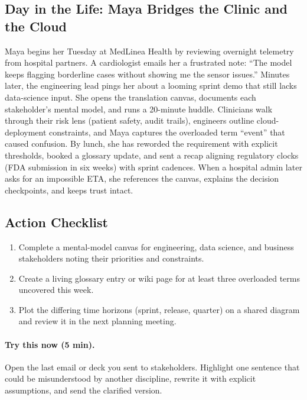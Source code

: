 \subsection{Day in the Life: Maya Bridges the Clinic and the Cloud}
Maya begins her Tuesday at MedLinea Health by reviewing overnight telemetry from hospital partners. A cardiologist emails her a frustrated note: ``The model keeps flagging borderline cases without showing me the sensor issues.'' Minutes later, the engineering lead pings her about a looming sprint demo that still lacks data-science input. She opens the translation canvas, documents each stakeholder's mental model, and runs a 20-minute huddle. Clinicians walk through their risk lens (patient safety, audit trails), engineers outline cloud-deployment constraints, and Maya captures the overloaded term ``event'' that caused confusion. By lunch, she has reworded the requirement with explicit thresholds, booked a glossary update, and sent a recap aligning regulatory clocks (FDA submission in six weeks) with sprint cadences. When a hospital admin later asks for an impossible ETA, she references the canvas, explains the decision checkpoints, and keeps trust intact.

\subsection{Action Checklist}
\begin{enumerate}
    \item Complete a mental-model canvas for engineering, data science, and business stakeholders noting their priorities and constraints.
    \item Create a living glossary entry or wiki page for at least three overloaded terms uncovered this week.
    \item Plot the differing time horizons (sprint, release, quarter) on a shared diagram and review it in the next planning meeting.
\end{enumerate}

\paragraph{Try this now (5 min).} Open the last email or deck you sent to stakeholders. Highlight one sentence that could be misunderstood by another discipline, rewrite it with explicit assumptions, and send the clarified version.

